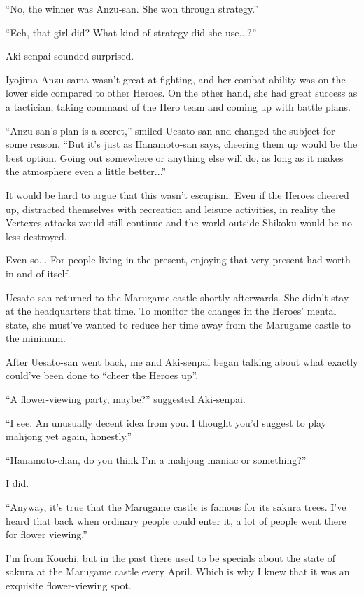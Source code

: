 ``No, the winner was Anzu-san. She won through strategy.''

``Eeh, that girl did? What kind of strategy did she use...?''

Aki-senpai sounded surprised.

Iyojima Anzu-sama wasn't great at fighting, and her combat ability was on the lower side compared to other Heroes. On the other hand, she had great success as a tactician, taking command of the Hero team and coming up with battle plans.

``Anzu-san's plan is a secret,'' smiled Uesato-san and changed the subject for some reason.  ``But it's just as Hanamoto-san says, cheering them up would be the best option. Going out somewhere or anything else will do, as long as it makes the atmosphere even a little better...''

It would be hard to argue that this wasn't escapism. Even if the Heroes cheered up, distracted themselves with recreation and leisure activities, in reality the Vertexes attacks would still continue and the world outside Shikoku would be no less destroyed.

Even so... For people living in the present, enjoying that very present had worth in and of itself.

Uesato-san returned to the Marugame castle shortly afterwards. She didn't stay at the headquarters that time. To monitor the changes in the Heroes' mental state, she must've wanted to reduce her time away from the Marugame castle to the minimum.

After Uesato-san went back, me and Aki-senpai began talking about what exactly could've been done to ``cheer the Heroes up''.

``A flower-viewing party, maybe?'' suggested Aki-senpai.

``I see. An unusually decent idea from you. I thought you'd suggest to play mahjong yet again, honestly.''

``Hanamoto-chan, do you think I'm a mahjong maniac or something?''

I did.

``Anyway, it's true that the Marugame castle is famous for its sakura trees. I've heard that back when ordinary people could enter it, a lot of people went there for flower viewing.''

I'm from Kouchi, but in the past there used to be specials about the state of sakura at the Marugame castle every April. Which is why I knew that it was an exquisite flower-viewing spot.


